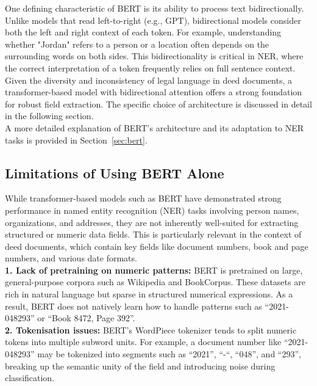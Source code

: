 \documentclass{article}
\begin{document}
One defining characteristic of BERT is its ability to process text bidirectionally. Unlike models that read left-to-right (e.g., GPT), bidirectional models consider both the left and right context of each token. For example, understanding whether "Jordan" refers to a person or a location often depends on the surrounding words on both sides. This bidirectionality is critical in NER, where the correct interpretation of a token frequently relies on full sentence context. \\

Given the diversity and inconsistency of legal language in deed documents, a transformer-based model with bidirectional attention offers a strong foundation for robust field extraction. The specific choice of architecture is discussed in detail in the following section. \\

A more detailed explanation of BERT's architecture and its adaptation to NER tasks is provided in Section~\ref{sec:bert}.

\subsection{Limitations of Using BERT Alone}

While transformer-based models such as BERT have demonstrated strong performance in named entity recognition (NER) tasks involving person names, organizations, and addresses, they are not inherently well-suited for extracting structured or numeric data fields. This is particularly relevant in the context of deed documents, which contain key fields like document numbers, book and page numbers, and various date formats. \\

\textbf{1. Lack of pretraining on numeric patterns:} BERT is pretrained on large, general-purpose corpora such as Wikipedia and BookCorpus. These datasets are rich in natural language but sparse in structured numerical expressions. As a result, BERT does not natively learn how to handle patterns such as ``2021-048293'' or ``Book 8472, Page 392''. \\

\textbf{2. Tokenisation issues:} BERT's WordPiece tokenizer tends to split numeric tokens into multiple subword units. \cite{schuster2012japanese} For example, a document number like ``2021-048293'' may be tokenized into segments such as ``2021'', ``-``, ``048'', and ``293'', breaking up the semantic unity of the field and introducing noise during classification. \\
\end{document}
